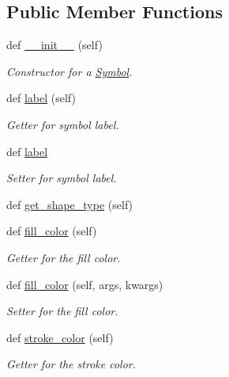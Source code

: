 \subsection*{Public Member Functions}
\begin{DoxyCompactItemize}
\item 
def \hyperlink{classbridges_1_1symbol_1_1_symbol_a57c7fcd41baccb9c2e15c9c828d957f6}{\+\_\+\+\_\+init\+\_\+\+\_\+} (self)
\begin{DoxyCompactList}\small\item\em Constructor for a \hyperlink{classbridges_1_1symbol_1_1_symbol}{Symbol}. \end{DoxyCompactList}\item 
def \hyperlink{classbridges_1_1symbol_1_1_symbol_a6e29aa07da4ce5b13130ada2688685fc}{label} (self)
\begin{DoxyCompactList}\small\item\em Getter for symbol label. \end{DoxyCompactList}\item 
def \hyperlink{classbridges_1_1symbol_1_1_symbol_a44d41804267e94598d0a29ca1a29c3b1}{label}
\begin{DoxyCompactList}\small\item\em Setter for symbol label. \end{DoxyCompactList}\item 
def \hyperlink{classbridges_1_1symbol_1_1_symbol_a92110f90e5a34104eb1eab6f9903deda}{get\+\_\+shape\+\_\+type} (self)
\item 
def \hyperlink{classbridges_1_1symbol_1_1_symbol_a1a5e9147e426fb7ec74fe60a5cdc9ded}{fill\+\_\+color} (self)
\begin{DoxyCompactList}\small\item\em Getter for the fill color. \end{DoxyCompactList}\item 
def \hyperlink{classbridges_1_1symbol_1_1_symbol_acec37468f0018db1416622062983eb46}{fill\+\_\+color} (self, args, kwargs)
\begin{DoxyCompactList}\small\item\em Setter for the fill color. \end{DoxyCompactList}\item 
def \hyperlink{classbridges_1_1symbol_1_1_symbol_ab7aef566eaf9624f6adc0ae1d5768b5b}{stroke\+\_\+color} (self)
\begin{DoxyCompactList}\small\item\em Getter for the stroke color. \end{DoxyCompactList}\item 

\end{DoxyCompactItemize}
